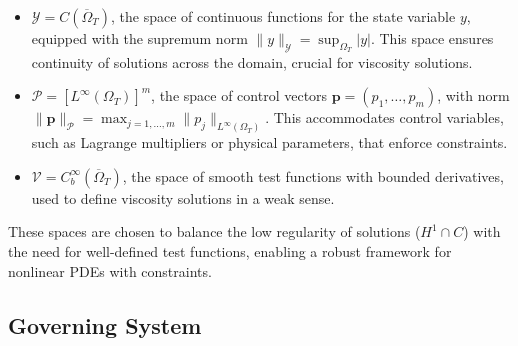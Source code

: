 \documentclass[pdflatex,sn-mathphys-num]{sn-jnl}%
\theoremstyle{thmstyleone}%
\numberwithin{equation}{section}
\begin{document}
\begin{itemize}
    \item \( \mathcal{Y} = C(\overline{\Omega}_T) \), the space of continuous functions for the state variable \( y \), equipped with the supremum norm \( \| y \|_{\mathcal{Y}} = \sup_{\Omega_T} |y| \). This space ensures continuity of solutions across the domain, crucial for viscosity solutions.
    \item \( \mathcal{P} = [L^\infty(\Omega_T)]^m \), the space of control vectors \( \bm{p} = (p_1, \dots, p_m) \), with norm \( \| \bm{p} \|_{\mathcal{P}} = \max_{j=1,\dots,m} \| p_j \|_{L^\infty(\Omega_T)} \). This accommodates control variables, such as Lagrange multipliers or physical parameters, that enforce constraints.
    \item \( \mathcal{V} = C_b^\infty(\overline{\Omega}_T) \), the space of smooth test functions with bounded derivatives, used to define viscosity solutions in a weak sense.
\end{itemize}

These spaces are chosen to balance the low regularity of solutions (\( H^1 \cap C \)) with the need for well-defined test functions, enabling a robust framework for nonlinear PDEs with constraints.

\subsection{Governing System}
\end{document}
